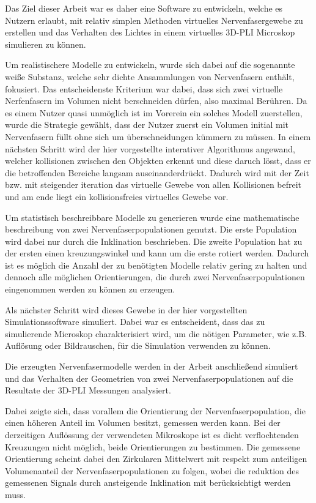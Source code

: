 Das Ziel dieser Arbeit war es daher eine Software zu entwickeln, welche es Nutzern erlaubt, mit relativ simplen Methoden virtuelles Nervenfasergewebe zu erstellen und das Verhalten des Lichtes in einem virtuelles 3D-PLI Microskop simulieren zu können.

Um realistischere Modelle zu entwickeln, wurde sich dabei auf die sogenannte weiße Substanz, welche sehr dichte Ansammlungen von Nervenfasern enthält, fokusiert.
Das entscheidenste Kriterium war dabei, dass sich zwei virtuelle Nerfenfasern im Volumen nicht berschneiden dürfen, also maximal Berühren.
Da es einem Nutzer quasi unmöglich ist im Vorerein ein solches Modell zuerstellen, wurde die Strategie gewählt, dass der Nutzer zuerst ein Volumen initial mit Nervenfasern füllt ohne sich um überschneidungen kümmern zu müssen.
In einem nächsten Schritt wird der hier vorgestellte interativer Algorithmus angewand, welcher kollisionen zwischen den Objekten erkennt und diese daruch lösst, dass er die betroffenden Bereiche langsam auseinanderdrückt.
Dadurch wird mit der Zeit bzw. mit steigender iteration das virtuelle Gewebe von allen Kollisionen befreit und am ende liegt ein kollisionsfreies virtuelles Gewebe vor.

Um statistisch beschreibbare Modelle zu generieren wurde eine mathematische beschreibung von zwei Nervenfaserpopulationen genutzt.
Die erste Population wird dabei nur durch die Inklination beschrieben.
Die zweite Population hat zu der ersten einen kreuzungswinkel und kann um die erste rotiert werden.
Dadurch ist es möglich die Anzahl der zu benötigten Modelle relativ gering zu halten und dennoch alle möglichen Orientierungen, die durch zwei Nervenfaserpopulationen eingenommen werden zu können zu erzeugen.

Als nächster Schritt wird dieses Gewebe in der hier vorgestellten Simulationssoftware simuliert.
Dabei war es entscheident, dass das zu simulierende Microskop charakterisiert wird, um die nötigen Parameter, wie z.B. Auflösung oder Bildrauschen, für die Simulation verwenden zu können.

Die erzeugten Nervenfasermodelle werden in der Arbeit anschließend simuliert und das Verhalten der Geometrien von zwei Nervenfaserpopulationen auf die Resultate der 3D-PLI Messungen analysiert.

Dabei zeigte sich, dass vorallem die Orientierung der Nervenfaserpopulation, die einen höheren Anteil im Volumen besitzt, gemessen werden kann.
Bei der derzeitigen Auflössung der verwendeten Mikroskope ist es dicht verflochtenden Kreuzungen nicht möglich, beide Orientierungen zu bestimmen.
Die gemessene Orientierung scheint dabei den Zirkularen Mittelwert mit respekt zum anteiligen Volumenanteil der Nervenfaserpopulationen zu folgen, wobei die reduktion des gemessenen Signals durch ansteigende Inklination mit berücksichtigt werden muss.


